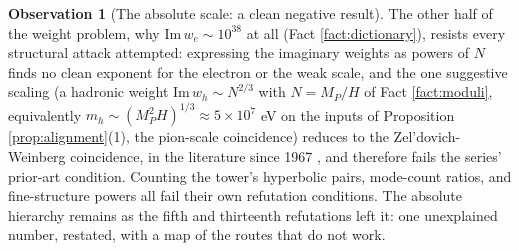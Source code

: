\documentclass[11pt]{article}
\theoremstyle{definition}
\newtheorem{observation}[theorem]{Observation}
\begin{document}
\begin{observation}[The absolute scale: a clean negative result]\label{obs:absolute}
The other half of the weight problem, why $\mathrm{Im}\,w_{e} \sim 10^{38}$ at all (Fact \ref{fact:dictionary}), resists every structural attack attempted: expressing the imaginary weights as powers of $N$ finds no clean exponent for the electron or the weak scale, and the one suggestive scaling (a hadronic weight $\mathrm{Im}\,w_{h} \sim N^{2/3}$ with $N = M_{P}/H$ of Fact \ref{fact:moduli}, equivalently $m_{h} \sim (M_{P}^{2}H)^{1/3} \approx 5 \times 10^{7}$ eV on the inputs of Proposition \ref{prop:alignment}(1), the pion-scale coincidence) reduces to the Zel'dovich-Weinberg coincidence, in the literature since 1967 \cite{Zeldovich1967, Weinberg1972}, and therefore fails the series' prior-art condition. Counting the tower's hyperbolic pairs, mode-count ratios, and fine-structure powers all fail their own refutation conditions. The absolute hierarchy remains as the fifth and thirteenth refutations left it: one unexplained number, restated, with a map of the routes that do not work.
\end{observation}
\end{document}
